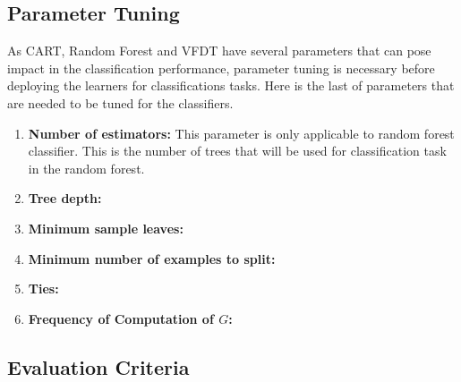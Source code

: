 \documentclass[sigplan]{acmart}\settopmatter{printfolios=true,printccs=false,printacmref=false}
\begin{document}
\subsection{Parameter Tuning}
As CART, Random Forest and VFDT have several parameters that can pose impact in the classification performance, parameter tuning is necessary before deploying the learners for classifications tasks. Here is the last of parameters that are needed to be tuned for the classifiers.

\begin{enumerate}
	\item \textbf{Number of estimators: } This parameter is only applicable to random forest classifier. This is the number of trees that will be used for classification task in the random forest. 
	\item \textbf{Tree depth: } 
	\item \textbf{Minimum sample leaves: }
	\item \textbf{Minimum number of examples to split: }
	\item \textbf{Ties: }
	\item \textbf{Frequency of Computation of $G$: }
\end{enumerate}

\subsection{Evaluation Criteria}



%
%
\end{document}

